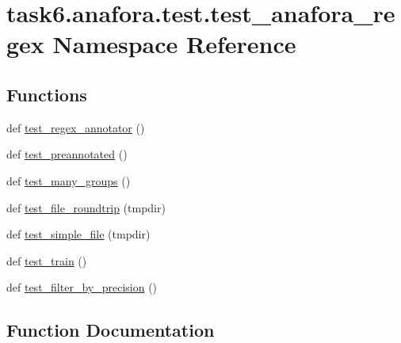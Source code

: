 \hypertarget{namespacetask6_1_1anafora_1_1test_1_1test__anafora__regex}{}\section{task6.\+anafora.\+test.\+test\+\_\+anafora\+\_\+regex Namespace Reference}
\label{namespacetask6_1_1anafora_1_1test_1_1test__anafora__regex}
\subsection*{Functions}
\begin{DoxyCompactItemize}
\item 
def \hyperlink{namespacetask6_1_1anafora_1_1test_1_1test__anafora__regex_ab9690e0aaba9e3e239021b9bae2e3322}{test\+\_\+regex\+\_\+annotator} ()
\item 
def \hyperlink{namespacetask6_1_1anafora_1_1test_1_1test__anafora__regex_af9df73e72aa2e7909569ecda8a745efe}{test\+\_\+preannotated} ()
\item 
def \hyperlink{namespacetask6_1_1anafora_1_1test_1_1test__anafora__regex_a8720e7adecf253b2cfc988c27c109d17}{test\+\_\+many\+\_\+groups} ()
\item 
def \hyperlink{namespacetask6_1_1anafora_1_1test_1_1test__anafora__regex_a8293f1e5c3343e242d0b329945e2ca7e}{test\+\_\+file\+\_\+roundtrip} (tmpdir)
\item 
def \hyperlink{namespacetask6_1_1anafora_1_1test_1_1test__anafora__regex_a8e76ce6209d3f7afaeaf542563844410}{test\+\_\+simple\+\_\+file} (tmpdir)
\item 
def \hyperlink{namespacetask6_1_1anafora_1_1test_1_1test__anafora__regex_a6fcfcb43d1062694cf99b40ef1f25f99}{test\+\_\+train} ()
\item 
def \hyperlink{namespacetask6_1_1anafora_1_1test_1_1test__anafora__regex_a48aea96c2df943f78d86f1c56d26231b}{test\+\_\+filter\+\_\+by\+\_\+precision} ()
\end{DoxyCompactItemize}


\subsection{Function Documentation}
\mbox{\label{namespacetask6_1_1anafora_1_1test_1_1test__anafora__regex_a8293f1e5c3343e242d0b329945e2ca7e}} 
